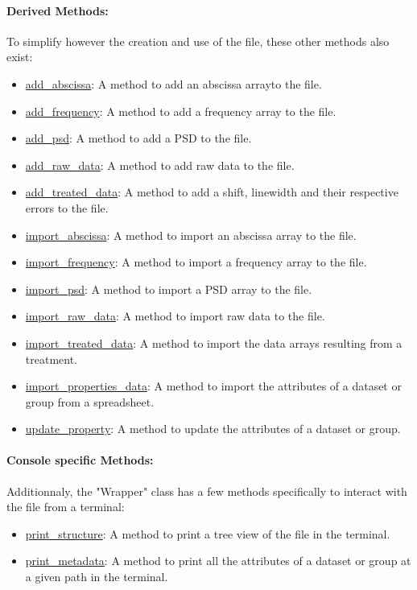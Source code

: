 \paragraph{Derived Methods:} 
To simplify however the creation and use of the file, these other methods also exist:
\begin{itemize}
    \item \hyperref[subchapter:wrapper.add_abscissa]{add\_abscissa}: A method to add an abscissa arrayto the file.
    \item \hyperref[subchapter:wrapper.add_frequency]{add\_frequency}: A method to add a frequency array to the file.
    \item \hyperref[subchapter:wrapper.add_psd]{add\_psd}: A method to add a PSD to the file.
    \item \hyperref[subchapter:wrapper.add_raw_data]{add\_raw\_data}: A method to add raw data to the file.
    \item \hyperref[subchapter:wrapper.add_treated_data]{add\_treated\_data}: A method to add a shift, linewidth and their respective errors to the file.
    \item \hyperref[subchapter:wrapper.import_abscissa]{import\_abscissa}: A method to import an abscissa array to the file.
    \item \hyperref[subchapter:wrapper.import_frequency]{import\_frequency}: A method to import a frequency array to the file.
    \item \hyperref[subchapter:wrapper.import_psd]{import\_psd}: A method to import a PSD array to the file.
    \item \hyperref[subchapter:wrapper.import_raw_data]{import\_raw\_data}: A method to import raw data to the file.
    \item \hyperref[subchapter:wrapper.import_treated_data]{import\_treated\_data}: A method to import the data arrays resulting from a treatment.
    \item \hyperref[subchapter:wrapper.import_properties_data]{import\_properties\_data}: A method to import the attributes of a dataset or group from a spreadsheet.
    \item \hyperref[subchapter:wrapper.update_property]{update\_property}: A method to update the attributes of a dataset or group.
\end{itemize}

\paragraph{Console specific Methods:} 
Additionnaly, the "Wrapper" class has a few methods specifically to interact with the file from a terminal:
\begin{itemize}
    \item \hyperref[subchapter:wrapper.print_structure]{print\_structure}: A method to print a tree view of the file in the terminal.
    \item \hyperref[subchapter:wrapper.print_metadata]{print\_metadata}: A method to print all the attributes of a dataset or group at a given path in the terminal.
\end{itemize}

